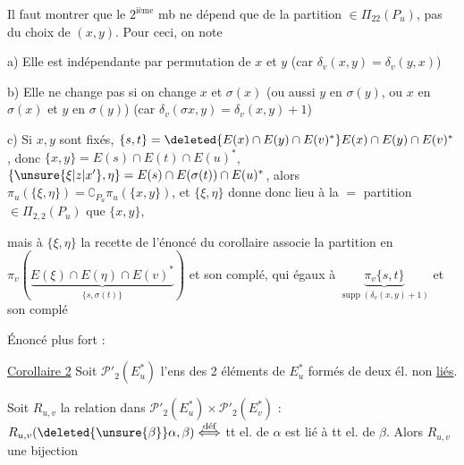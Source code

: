 
Il faut montrer que le $2^{\mathrm{ième}}$ mb ne dépend que de la partition $\in\Pi_{22}(P_u)$, pas du choix de $(x,y)$. Pour ceci, on note

a) Elle est indépendante par permutation de $x$ et $y$  (car $\delta_v(x,y)=\delta_v(y,x)$)

b) Elle ne change pas si on change $x$ et $\sigma(x)$ (ou aussi $y$ en $\sigma(y)$, ou $x$ en $\sigma(x)$ et $y$ en $\sigma(y)$) (car $\delta_v(\sigma x,y)=\delta_v(x,y)+1$)

c) Si $x,y$ sont fixés,   $\{s,t\}=\deleted{E(x)\cap E(y)\cap E(v)^*}E(x)\cap E(y)\cap E(v)^*$, donc  $\{x,y\}=E(s)\cap E(t)\cap E(u)^*$,  $\{\unsure{\xi|z|x'},\eta\}=E(s)\cap E(\sigma(t))\cap E(u)^*$, alors $\pi_u(\{\xi,\eta\})=\complement_{P_u}\pi_u(\{x,y\})$,  et $\{\xi,\eta\}$ donne donc lieu à la $=$ partition $\in\Pi_{2,2}(P_u)$ que $\{x,y\}$,

mais à $\{\xi,\eta\}$ la recette  de l'énoncé du corollaire associe la partition en $\pi_v(\underbrace{E(\xi)\cap E(\eta)\cap E(v)^*}_{\{s,\sigma(t)\}})$ et son complé, qui  égaux à $\underbrace{\pi_v\{s,t\}}_{\operatorname{supp}(\delta_v(x,y)+1)}$ et son complé \unsure{---|\dots}

Énoncé plus fort :

\uline{Corollaire 2} Soit $\mathcal P'_2(E_u^*)$ l'ens des  2 éléments de $E_u^*$ formés de deux él. non \uline{liés}.

Soit $R_{u,v}$ la relation  dans $\mathcal P'_2(E_u^*)\times\mathcal P'_2(E_v^*)$ : $R_{u,v}(\deleted{\unsure{\beta}}\alpha,\beta)\overset{\text{déf}}{\Longleftrightarrow}$ tt el. de $\alpha$ est lié à tt el. de $\beta$. Alors $R_{u,v}$  une bijection


